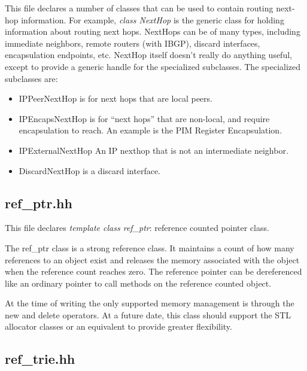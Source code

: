 \documentclass[11pt]{article}
\begin{document}
This file declares a number of classes that can be used to contain
routing next-hop information. For example, \emph{class NextHop}
is the generic class for holding information about routing
next hops.  NextHops can be of many types, including immediate
neighbors, remote routers (with IBGP), discard interfaces,
encapsulation endpoints, etc.  NextHop itself doesn't really do
anything useful, except to provide a generic handle for the
specialized subclasses. The specialized subclasses are:

\begin{itemize}

  \item IPPeerNextHop is for next hops that are local peers.

  \item IPEncapsNextHop is for ``next hops'' that are non-local, and require
   encapsulation to reach. An example is the PIM Register Encapsulation.

  \item IPExternalNextHop An IP nexthop that is not an intermediate
  neighbor.

  \item DiscardNextHop is a discard interface.

\end{itemize}


\subsection{ref\_ptr.hh}

This file declares \emph{template class ref\_ptr}: reference counted
pointer class.

The ref\_ptr class is a strong reference class.  It maintains a count of
how many references to an object exist and releases the memory associated
with the object when the reference count reaches zero.  The reference
pointer can be dereferenced like an ordinary pointer to call methods
on the reference counted object.

At the time of writing the only supported memory management is
through the new and delete operators.  At a future date, this class
should support the STL allocator classes or an equivalent to
provide greater flexibility.

\subsection{ref\_trie.hh}
\end{document}
